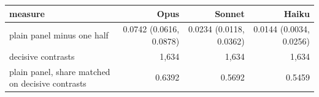\begin{tabular}{p{6.6cm}rrr}
\toprule
measure & Opus & Sonnet & Haiku \\
\midrule
plain panel minus one half & 0.0742 (0.0616, 0.0878) & 0.0234 (0.0118, 0.0362) & 0.0144 (0.0034, 0.0256) \\
decisive contrasts & 1,634 & 1,634 & 1,634 \\
plain panel, share matched on decisive contrasts & 0.6392 & 0.5692 & 0.5459 \\

\end{tabular}
